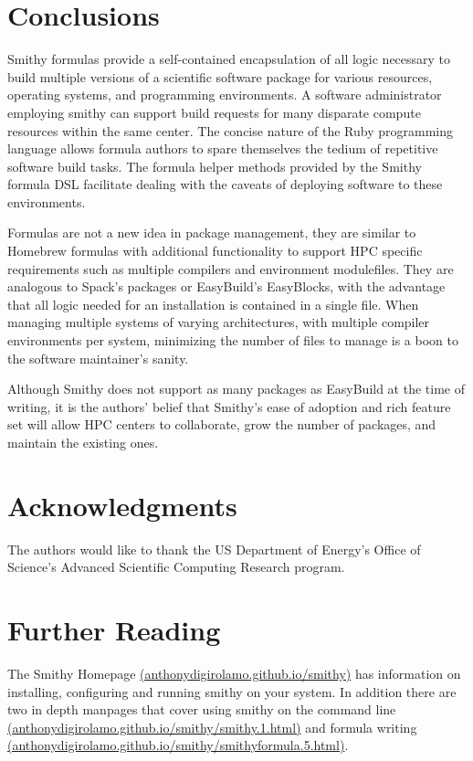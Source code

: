 \documentclass{acm_proc_article-sp}
\begin{document}
\section{Conclusions}

Smithy formulas provide a self-contained encapsulation of all logic necessary to
build multiple versions of a scientific software package for various resources,
operating systems, and programming environments. A software administrator
employing smithy can support build requests for many disparate compute resources
within the same center. The concise nature of the Ruby programming language
allows formula authors to spare themselves the tedium of repetitive software
build tasks. The formula helper methods provided by the Smithy formula DSL
facilitate dealing with the caveats of deploying software to these environments.

Formulas are not a new idea in package management, they are similar to Homebrew
formulas with additional functionality to support HPC specific requirements such
as multiple compilers and environment modulefiles. They are analogous to Spack's
packages or EasyBuild's EasyBlocks, with the advantage that all logic needed for
an installation is contained in a single file. When managing multiple systems of
varying architectures, with multiple compiler environments per system,
minimizing the number of files to manage is a boon to the software maintainer's
sanity.

Although Smithy does not support as many packages as EasyBuild at the time of
writing, it is the authors' belief that Smithy's ease of adoption and rich
feature set will allow HPC centers to collaborate, grow the number of packages,
and maintain the existing ones.

\section{Acknowledgments}

The authors would like to thank the US Department of Energy's Office of
Science's Advanced Scientific Computing Research program.

\section{Further Reading}

The Smithy Homepage
\href{http://anthonydigirolamo.github.io/smithy/}{(anthonydigirolamo.github.io/smithy)}
has information on installing, configuring and running smithy on your system. In
addition there are two in depth manpages that cover using smithy on the command
line
\href{http://anthonydigirolamo.github.io/smithy/smithy.1.html}{(anthonydigirolamo.github.io/smithy/smithy.1.html)}
and formula writing
\href{http://anthonydigirolamo.github.io/smithy/smithyformula.5.html}{(anthonydigirolamo.github.io/smithy/smithyformula.5.html)}.
\end{document}
